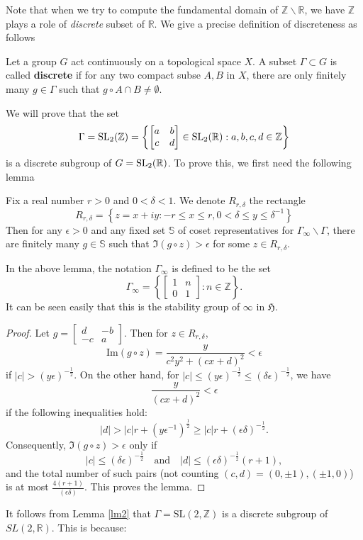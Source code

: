 Note that when we try to compute the fundamental domain of $\mathbb{Z}\backslash \mathbb{R}$, we have $\mathbb{Z}$ plays a role of
\textit{discrete} subset of $\mathbb{R}$. We give a precise definition of discreteness as follows
\begin{definition}
  Let a group $G$ act continuously on a topological space $X$. A subset $\Gamma \subset G$ is called \textbf{discrete} if for any two compact subse
  $A,B$ in $X$, there are only finitely many $g \in \Gamma$ such that $g \circ A \cap B \ne \emptyset$.
\end{definition}
We will prove that the set
\[\Gamma = \operatorname{SL_2(\mathbb{Z})} = \left\lbrace \begin{bmatrix}
    a & b \\
    c & d
  \end{bmatrix} \in \operatorname{SL_2(\mathbb{R})}: a, b, c, d \in \mathbb{Z}\right\rbrace\]
is a discrete subgroup of $G = \operatorname{SL_2(\mathbb{R})}$.
To prove this, we first need the following lemma
\begin{lemma}\label{lm2}
  Fix a real number $r>0$ and $0<\delta<1$. We denote $R_{r,\delta}$ the rectangle
  \[R_{r,\delta} = \left\lbrace z = x+iy: -r \le x \le r, 0 <\delta \le y \le \delta^{-1}\right\rbrace\]
  Then for any $\epsilon >0$ and any fixed set $\mathbb{S}$ of coset representatives for $\Gamma_\infty\backslash \Gamma$, there are finitely
  many $g \in \mathbb{S}$ such that $\Im(g\circ z)>\epsilon$ for some $z \in R_{r,\delta}$.
\end{lemma}
In the above lemma, the notation $\Gamma_\infty$ is defined to be the set
\[ \Gamma_\infty = \left\lbrace\begin{bmatrix}
    1 & n \\
    0 & 1
  \end{bmatrix}: n \in \mathbb{Z} \right\rbrace.\] It can be seen easily that this is the
stability group of $\infty$ in $\mathfrak{H}$.
\begin{proof}
  Let \( g = \begin{bmatrix} d & -b \\ -c & a \end{bmatrix} \). Then for \( z \in R_{r, \delta} \),
  \[
    \text{Im}(g \circ z) = \frac{y}{c^2 y^2 + (cx + d)^2} < \epsilon
  \]
  if \( |c| > (y \epsilon)^{-\frac{1}{2}} \). On the other hand, for \( |c| \leq (y \epsilon)^{-\frac{1}{2}} \leq (\delta \epsilon)^{-\frac{1}{2}} \), we have
  \[
    \frac{y}{(cx + d)^2} < \epsilon
  \]
  if the following inequalities hold:
  \[
    |d| > |c| r + (y \epsilon^{-1})^{\frac{1}{2}} \geq |c| r + (\epsilon \delta)^{-\frac{1}{2}}.
  \]
  Consequently, \(\Im(g \circ z) > \epsilon\) only if
  \[
    |c| \leq (\delta \epsilon)^{-\frac{1}{2}} \quad \text{and} \quad |d| \leq (\epsilon \delta)^{-\frac{1}{2}} (r + 1),
  \]
  and the total number of such pairs (not counting $(c, d) = (0, \pm 1), (\pm 1, 0)$) is at most $\frac{4(r+1)} {(\epsilon \delta)}$. This proves the lemma.
\end{proof}
It follows from Lemma \ref{lm2} that $\Gamma = \text{SL}(2, \mathbb{Z})$ is a discrete subgroup of $SL(2, \mathbb{R})$. This is because:


